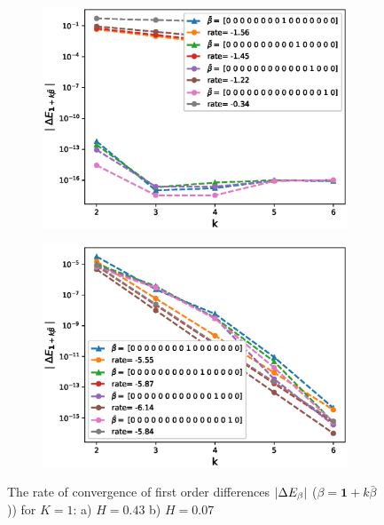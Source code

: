 \documentclass[11pt]{article}
\begin{document}
\begin{figure}[h!]
	\centering
	\begin{subfigure}{.5\textwidth}
		\centering
		\includegraphics[width=1\linewidth]{./figures/effect_H_differences/hierarchical/H_043/N_8/first_difference_rbergomi_8steps_H_043_K_1_hierarch_with_rate_W2.eps}
		\caption{}
		\label{fig:sub3}
	\end{subfigure}%
	\begin{subfigure}{.5\textwidth}
		\centering
		\includegraphics[width=1\linewidth]{./figures/effect_H_differences/hierarchical/H_007/N_8/first_difference_rbergomi_8steps_H_007_K_1_hierarch_with_rate_W2.eps}
		\caption{}
		\label{fig:sub4}
	\end{subfigure}
	
	\caption{The rate of convergence of  first order differences $\left\lvert\Delta E_{\beta}\right\rvert$ ($\beta=\mathbf{1}+k \bar{\beta}$)) for $K=1$: a) $H=0.43$ b)  $H=0.07$}
	\label{fig:test2}
\end{figure}
\end{document}

